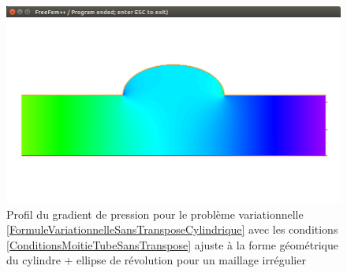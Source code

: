 \documentclass[11pt,a4paper]{article}
\numberwithin{equation}{subsection}
\numberwithin{figure}{subsection}
\begin{document}
\begin{figure}[h]
\centering
\includegraphics[scale=0.4]{StokesClassiquePressionCylindreEllipseIrregulier.png}
\caption{Profil du gradient de pression pour le problème variationnelle \ref{FormuleVariationnelleSansTransposeCylindrique} avec les conditions \ref{ConditionsMoitieTubeSansTranspose} ajuste à la forme géométrique du cylindre + ellipse de révolution pour un maillage irrégulier}
\label{StokesClassiquePressionCylindreEllipseIrregulier}
\end{figure}
\end{document}
